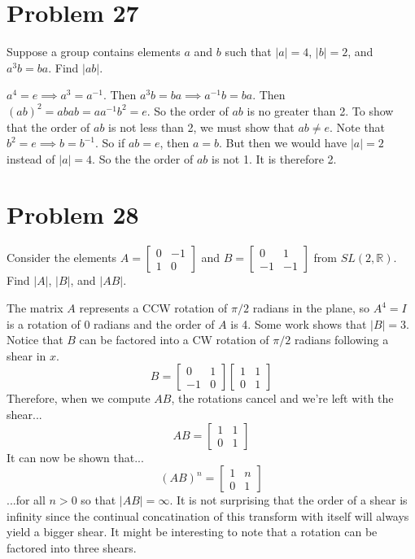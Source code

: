 \documentclass{article}
\begin{document}
\section*{Problem 27}

Suppose a group contains elements $a$ and $b$ such that $|a|=4$, $|b|=2$,
and $a^3b=ba$.  Find $|ab|$.

$a^4=e\implies a^3=a^{-1}$.  Then $a^3b=ba\implies a^{-1}b=ba$.
Then $(ab)^2=abab=aa^{-1}b^2=e$.  So the order of $ab$ is no greater than 2.
To show that the order of $ab$ is not less than 2, we must show that
$ab\neq e$.  Note that $b^2=e\implies b=b^{-1}$.  So if $ab=e$, then $a=b$.
But then we would have $|a|=2$ instead of $|a|=4$.  So the the order of $ab$
is not 1.  It is therefore 2.

\section*{Problem 28}

Consider the elements $A=\left[\begin{array}{cc}0&-1\\1&0\end{array}\right]$ and
$B=\left[\begin{array}{cc}0&1\\-1&-1\end{array}\right]$ from $SL(2,\mathbb{R})$.
Find $|A|$, $|B|$, and $|AB|$.

The matrix $A$ represents a CCW rotation of $\pi/2$ radians in the plane, so
$A^4=I$ is a rotation of 0 radians and the order of $A$ is 4.
Some work shows that $|B|=3$.
Notice that $B$ can be factored into a CW rotation of $\pi/2$ radians following
a shear in $x$.
\begin{equation*}
B = 
\left[\begin{array}{cc}0&1\\-1&0\end{array}\right]
\left[\begin{array}{cc}1&1\\0&1\end{array}\right]
\end{equation*}
Therefore, when we compute $AB$, the rotations cancel and we're left
with the shear...
\begin{equation*}
AB = \left[\begin{array}{cc}1&1\\0&1\end{array}\right]
\end{equation*}
It can now be shown that...
\begin{equation*}
(AB)^n = \left[\begin{array}{cc}1&n\\0&1\end{array}\right]
\end{equation*}
...for all $n>0$ so that $|AB|=\infty$.  It is not surprising that the order of a shear
is infinity since the continual concatination of this transform with itself
will always yield a bigger shear.  It might be interesting to note that a rotation
can be factored into three shears.
\end{document}
